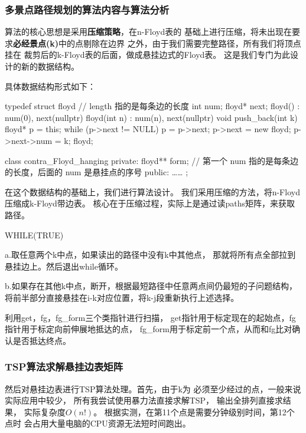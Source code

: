 \documentclass[withoutpreface,bwprint]{cumcmthesis} %
\begin{document}
\subsubsection{多景点路径规划的算法内容与算法分析}

算法的核心思想是采用\textbf{压缩策略}，在n-Floyd表的
基础上进行压缩，将未出现在要求\textbf{必经景点(k)}中的点剔除在边界
之外，由于我们需要完整路径，所有我们将顶点挂在
裁剪后的k-Floyd表的后面，做成悬挂边式的Floyd表。
这是我们专门为此设计的新的数据结构。

具体数据结构形式如下：

\begin{tcode}
    typedef struct floyd{
        // length 指的是每条边的长度
        int num;
        floyd* next;
        floyd() : num(0), next(nullptr) {}
        floyd(int n) : num(n), next(nullptr) {}
        void push_back(int k) {
            floyd* p = this;
            while (p->next != NULL) p = p->next;
            p->next = new floyd;
            p->next->num = k;
        }
    }floyd;

    class contra_Floyd_hanging {
    private:
        floyd** form;
        // 第一个 num 指的是每条边的长度，后面的 num 是悬挂点的序号
    public:
    ……
    };
\end{tcode}

在这个数据结构的基础上，我们进行算法设计。
我们采用压缩的方法，将n-Floyd压缩成k-Floyd带边表。
核心在于压缩过程，实际上是通过读paths矩阵，来获取路径。

\begin{tcolorbox}[mydashedbox]
WHILE(TRUE)

a.取任意两个k中点，如果读出的路径中没有k中其他点，
那就将所有点全部拉到悬挂边上。然后退出while循环。

b.如果存在其他k中点，断开，根据最短路径中任意两点间仍最短的子问题结构，
将前半部分直接悬挂在i-k对应位置，将k-j段重新执行上述选择。
\end{tcolorbox}

利用get，fg，fg\_form三个类指针进行扫描，
get指针用于标定现在的起始点，fg指针用于标定向前伸展地抵达的点，
fg\_form用于标定前一个点，从而和fg比对确认是否抵达终点。

\subsubsection{TSP算法求解悬挂边表矩阵}

然后对悬挂边表进行TSP算法处理。首先，由于k为
必须至少经过的点，一般来说实际应用中较少，
所有我尝试使用暴力法直接求解TSP，
输出全排列直接求结果，
实际复杂度$O(n!)$。
根据实测，在第11个点是需要分钟级别时间，第12个点时
会占用大量电脑的CPU资源无法短时间跑出。
\end{document}
